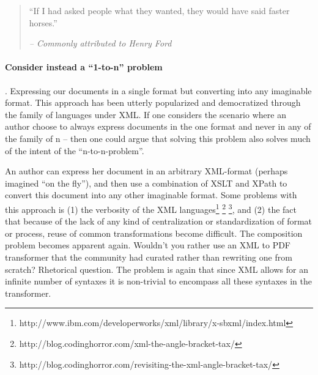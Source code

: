 \documentclass{scrreprt}
\begin{document}
\begin{quote}
``If I had asked people what they wanted, they would have said faster horses.''
\begin{flushright}
\textit{-- Commonly attributed to Henry Ford}
\end{flushright}
\end{quote}


\paragraph{Consider instead a ``1-to-n'' problem}. Expressing our documents in a single format but converting into any imaginable format. This approach has been utterly popularized and democratized through the family of languages under XML. If one considers the scenario where an author choose to always express documents in the one format and never in any of the family of n -- then one could argue that solving this problem also solves much of the intent of the ``n-to-n-problem''.

An author can express her document in an arbitrary XML-format (perhaps imagined ``on the fly''), and then use a combination of XSLT and XPath to convert this document into any other imaginable format. Some problems with this approach is (1) the verbosity of the XML languages\footnote{http://www.ibm.com/developerworks/xml/library/x-sbxml/index.html} \footnote{http://blog.codinghorror.com/xml-the-angle-bracket-tax/} \footnote{http://blog.codinghorror.com/revisiting-the-xml-angle-bracket-tax/}, and (2) the fact that because of the lack of any kind of centralization or standardization of format or process, reuse of common transformations become difficult. The composition problem becomes apparent again. Wouldn't you rather use an XML to PDF transformer that the community had curated rather than rewriting one from scratch? Rhetorical question. The problem is again that since XML allows for an infinite number of syntaxes it is non-trivial to encompass all these syntaxes in the transformer.

\end{document}
